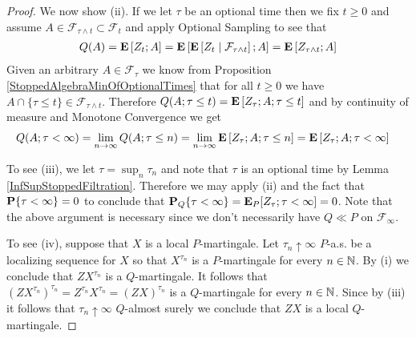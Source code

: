\begin{proof}
We now show (ii).  If we let $\tau$ be an optional time then we fix $t \geq 0$ and assume $A \in \mathcal{F}_{\tau \wedge t} \subset \mathcal{F}_t$ and apply Optional Sampling to see that 
\begin{align*}
Q(A) = \expectation{Z_t ; A} = \expectation{\cexpectationlong{\mathcal{F}_{\tau\wedge t}}{Z_t} ; A} =  \expectation{Z_{\tau \wedge t}; A} 
\end{align*}
Given an arbitrary $A \in \mathcal{F}_\tau$ we know from Proposition \ref{StoppedAlgebraMinOfOptionalTimes} that for all $t \geq 0$ we have $A \cap \lbrace \tau \leq t \rbrace \in \mathcal{F}_{\tau \wedge t}$.  Therefore $Q(A ; \tau \leq t) = \expectation{Z_{\tau}; A; \tau \leq t}$ and by continuity of measure and Monotone Convergence we get 
\begin{align*}
Q(A ; \tau < \infty) &= \lim_{n \to \infty} Q(A ; \tau \leq n) = \lim_{n \to \infty} \expectation{Z_{\tau}; A; \tau \leq n}= \expectation{Z_{\tau}; A; \tau < \infty}
\end{align*}

To see (iii), we let $\tau = \sup_n \tau_n$ and note that $\tau$ is an optional time by Lemma \ref{InfSupStoppedFiltration}.  Therefore we may apply (ii) and the fact that $\probability{\tau < \infty} = 0$ to conclude that $\sprobability{\tau < \infty}{Q} = \sexpectation{Z_\tau ; \tau < \infty}{P} = 0$.  Note that the above argument is necessary since we don't necessarily have $Q \ll P$ on $\mathcal{F}_\infty$.

To see (iv), suppose that $X$ is a local $P$-martingale.  Let $\tau_n \uparrow \infty$ $P$-a.s. be a localizing sequence for $X$ so that $X^{\tau_n}$ is a $P$-martingale for every $n \in \naturals$.  By (i) we conclude that $Z X^{\tau_n}$ is a $Q$-martingale.  It follows that $(Z X^{\tau_n})^{\tau_n} = Z^{\tau_n} X^{\tau_n} = (Z X)^{\tau_n}$ is a $Q$-martingale for every $n \in \naturals$.  Since by (iii) it follows that $\tau_n \uparrow \infty$ $Q$-almost surely we conclude that $ZX$ is a local $Q$-martingale.  


\end{proof}

